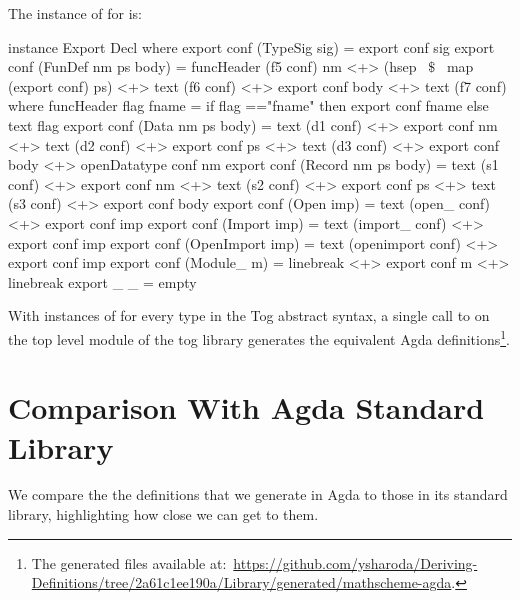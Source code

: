 The instance of  for  is:  
\begin{hscode}
instance Export Decl where
  export conf (TypeSig sig) = export conf sig 
  export conf (FunDef nm ps body) =
    funcHeader (f5 conf) nm <+> (hsep ~$\$$~ map (export conf) ps) 
    <+> text (f6 conf) <+> export conf body <+> text (f7 conf)
    where funcHeader flag fname = 
            if flag =="fname" then export conf fname else text flag    
  export conf (Data nm ps body) =
    text (d1 conf) <+> export conf nm <+> text (d2 conf) 
    <+> export conf ps <+> text (d3 conf) <+> export conf body 
    <+> openDatatype conf nm
  export conf (Record nm ps body) =
    text (s1 conf) <+> export conf nm <+> text (s2 conf) 
    <+> export conf ps <+> text (s3 conf) <+> export conf body 
  export conf (Open imp) = text (open_ conf) <+> export conf imp
  export conf (Import imp) = text (import_ conf) <+> export conf imp
  export conf (OpenImport imp) = 
    text (openimport conf) <+> export conf imp
  export conf (Module_ m) =
    linebreak <+> export conf m  <+> linebreak 
  export _ _ = empty
\end{hscode}

With instances of  for every type in the Tog abstract syntax, a single call to  on the top level module of the tog library generates the equivalent Agda definitions\footnote{The generated files available at:~\url{https://github.com/ysharoda/Deriving-Definitions/tree/2a61c1ee190a/Library/generated/mathscheme-agda}.}.

\section{Comparison With Agda Standard Library}
\label{sec:compasion_agda_stdlib}
We compare the the definitions that we generate in Agda to those in its standard library, highlighting how close we can get to them. 

